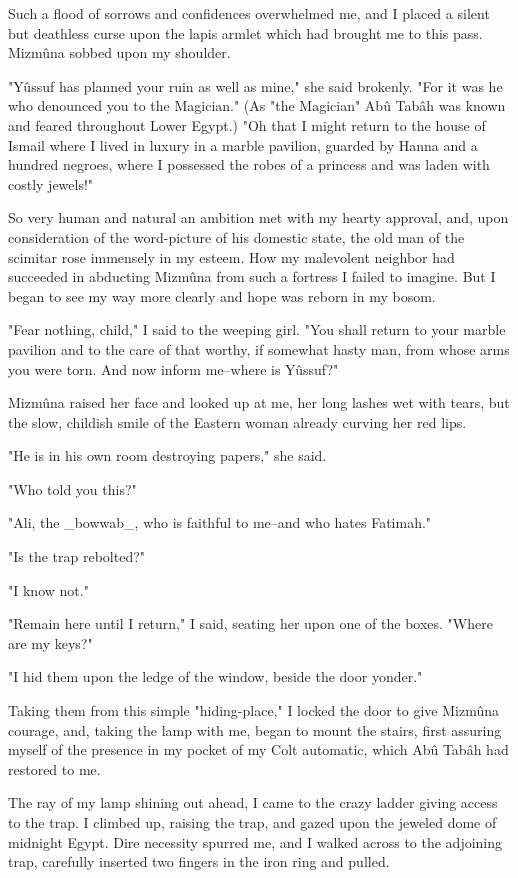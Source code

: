 Such a flood of sorrows and confidences overwhelmed me, and I placed a
silent but deathless curse upon the lapis armlet which had brought me
to this pass. Mizmûna sobbed upon my shoulder.

"Yûssuf has planned your ruin as well as mine," she said brokenly.
"For it was he who denounced you to the Magician." (As "the Magician"
Abû Tabâh was known and feared throughout Lower Egypt.) "Oh that I
might return to the house of Ismail where I lived in luxury in a
marble pavilion, guarded by Hanna and a hundred negroes, where I
possessed the robes of a princess and was laden with costly jewels!"

So very human and natural an ambition met with my hearty approval,
and, upon consideration of the word-picture of his domestic state, the
old man of the scimitar rose immensely in my esteem. How my malevolent
neighbor had succeeded in abducting Mizmûna from such a fortress I
failed to imagine. But I began to see my way more clearly and hope was
reborn in my bosom.

"Fear nothing, child," I said to the weeping girl. "You shall return
to your marble pavilion and to the care of that worthy, if somewhat
hasty man, from whose arms you were torn. And now inform me--where is
Yûssuf?"

Mizmûna raised her face and looked up at me, her long lashes wet with
tears, but the slow, childish smile of the Eastern woman already
curving her red lips.

"He is in his own room destroying papers," she said.

"Who told you this?"

"Ali, the _bowwab_, who is faithful to me--and who hates Fatimah."

"Is the trap rebolted?"

"I know not."

"Remain here until I return," I said, seating her upon one of the
boxes. "Where are my keys?"

"I hid them upon the ledge of the window, beside the door yonder."

Taking them from this simple "hiding-place," I locked the door to
give Mizmûna courage, and, taking the lamp with me, began to mount
the stairs, first assuring myself of the presence in my pocket of
my Colt automatic, which Abû Tabâh had restored to me.

The ray of my lamp shining out ahead, I came to the crazy ladder
giving access to the trap. I climbed up, raising the trap, and gazed
upon the jeweled dome of midnight Egypt. Dire necessity spurred me,
and I walked across to the adjoining trap, carefully inserted two
fingers in the iron ring and pulled.


